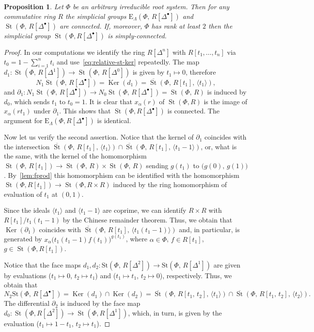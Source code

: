 \documentclass[oneside, 11pt]{amsart} \pdfoutput=1
\newcommand{\Ker}{\mathop{\mathrm{Ker}}\nolimits}
\newcommand{\St}{\mathop{\mathrm{St}}\nolimits}
\newcommand{\E}{\mathrm{E}}
\numberwithin{equation}{section}
\newtheorem{prop}[lemma]{Proposition}
\theoremstyle{definition}
\begin{document}
\begin{prop}\label{prop:pi1-StDelta} Let $\Phi$ be an arbitrary irreducible root system. Then for any commutative ring $R$ the simplicial groups $\E_\Lambda(\Phi,\,R[\Delta^\bullet])$ and $\St(\Phi,\,R[\Delta^\bullet])$ are connected. If, moreover, $\Phi$ has rank at least $2$ then the simplicial group $\St(\Phi, R[\Delta^\bullet])$ is simply-connected. \end{prop}
\begin{proof}
In our computations we identify the ring $R[\Delta^n]$ with $R[t_1, \ldots, t_n]$ via $t_0 = 1 - \sum_{i=1}^n t_i$ and use~\eqref{eq:relative-st-ker} repeatedly.
The map $d_1\colon\St(\Phi,\,R[\Delta^1])\rightarrow\St(\Phi,\,R[\Delta^0])$ is given by $t_1\mapsto0$, therefore \[N_1\St(\Phi,\,R[\Delta^\bullet])=\Ker(d_1)=\overline{\St}(\Phi,\,R[t_1],\,\langle t_1\rangle),\]
and $\partial_1\colon N_1\St(\Phi,\,R[\Delta^\bullet])\rightarrow N_0\St(\Phi,\,R[\Delta^\bullet])=\St(\Phi,\,R)$ is induced by $d_0$, which sends $t_1$ to $t_0=1$. 
It is clear that $x_\alpha(r)$ of $\St(\Phi, R)$ is the image of $x_\alpha(rt_1)$ under $\partial_1$.
This shows that $\St(\Phi, R[\Delta^\bullet])$ is connected. The argument for $\E_\Lambda(\Phi, R[\Delta^\bullet])$ is identical.

Now let us verify the second assertion. Notice that the kernel of $\partial_1$ coincides with the intersection $\overline{\St}(\Phi,\,R[t_1],\,\langle t_1\rangle)\cap\overline{\St}(\Phi,\,R[t_1],\,\langle t_1-1 \rangle )$, or, what is the same, with the kernel of the homomorphism
$\St(\Phi,\,R[t_1])\rightarrow\St(\Phi,\,R)\times\St(\Phi,\,R)$
sending $g(t_1)$ to $\big(g(0),\,g(1)\big)$. By~\cref{lem:fprod} this homomorphism can be identified with the homomorphism $\St(\Phi, R[t_1]) \to \St(\Phi, R\times R)$ induced by the ring homomorphism of evaluation of $t_1$ at $(0, 1)$.

Since the ideals $\langle t_1 \rangle$ and $\langle t_1-1 \rangle$ are coprime, we can identify $R\times R$ with $R[t_1]/t_1(t_1-1)$ by the Chinese remainder theorem. Thus, we obtain that $\Ker(\partial_1)$ coincides with $\overline{\St}(\Phi,\,R[t_1],\,\langle t_1(t_1-1) \rangle)$ and, in particular, is generated by $x_\alpha\big(t_1(t_1-1)f(t_1)\big)^{g(t_1)}$, where $\alpha \in \Phi$, $f\in R[t_1]$, $g \in \St(\Phi, R[t_1])$.

Notice that the face maps $d_1, d_2\colon\mathrm{St}(\Phi,\,R[\Delta^2])\rightarrow\mathrm{St}(\Phi,\,R[\Delta^1])$ are given by evaluations ($t_1\mapsto0$, $t_2\mapsto t_1$) and ($t_1\mapsto t_1$, $t_2\mapsto0$), respectively. Thus, we obtain that \[N_2\mathrm{St}(\Phi,\,R[\Delta^\bullet])=\Ker(d_1)\cap\Ker(d_2)=\overline{\St}(\Phi,\,R[t_1,\,t_2],\,\langle t_1\rangle )\cap\overline{\St}(\Phi,\,R[t_1,\,t_2],\,\langle t_2\rangle).\]
The differential $\partial_2$ is induced by the face map $d_0 \colon \St(\Phi, R[\Delta^2]) \to \St(\Phi, R[\Delta^1])$, which, in turn, is given by the evaluation ($t_1 \mapsto 1-t_1$, $t_2 \mapsto t_1$). 


\end{proof}
\end{document}
